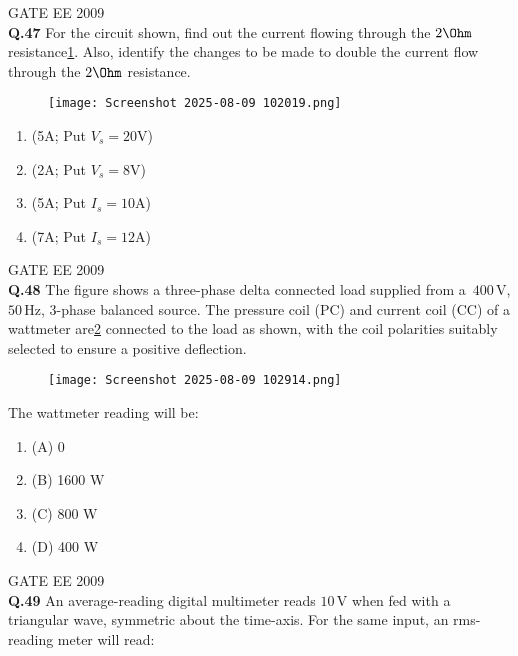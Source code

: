 \documentclass[12pt]{article}
\begin{document}
\hspace{10pt}
GATE EE 2009\\

\noindent\textbf{Q.47} For the circuit shown, find out the current flowing through the $2 \Ohm$ resistance\ref{fig:15}.
Also, identify the changes to be made to double the current flow through the $2\Ohm$ resistance.
\begin{figure}[h]
    \centering
    \texttt{[image: Screenshot 2025-08-09 102019.png]}
    \label{fig:15}
\end{figure}

\begin{enumerate}
    

\item (5A; Put $V_s = 20$V) 
\item  (2A; Put $V_s = 8$V) 
\item  (5A; Put $I_s = 10$A) 
\item  (7A; Put $I_s = 12$A) 
\end{enumerate}
\hspace{10pt}
GATE EE 2009\\

\textbf{Q.48} The figure shows a three-phase delta connected load supplied from a \(\,400 \, \mathrm{V}\),
\(50\, \mathrm{Hz}\), 3-phase balanced source. The pressure coil (PC) and current coil (CC) of a wattmeter are\ref{fig:16}
connected to the load as shown, with the coil polarities suitably selected to ensure a positive deflection.


\begin{figure}[h]
    \centering
    \texttt{[image: Screenshot 2025-08-09 102914.png]}
    \label{fig:16}
\end{figure}
The wattmeter reading will be:


\noindent
\begin{enumerate}
    
\item (A) 0 
\item (B) 1600 W 
\item (C) 800 W 
\item (D) 400 W
\end{enumerate}

\vspace{0.5cm}
\hspace{10pt}
GATE EE 2009\\
\textbf{Q.49} An average-reading digital multimeter reads \(10 \, \mathrm{V}\) when fed with a triangular wave,
symmetric about the time-axis. For the same input, an rms-reading meter will read:
\end{document}
